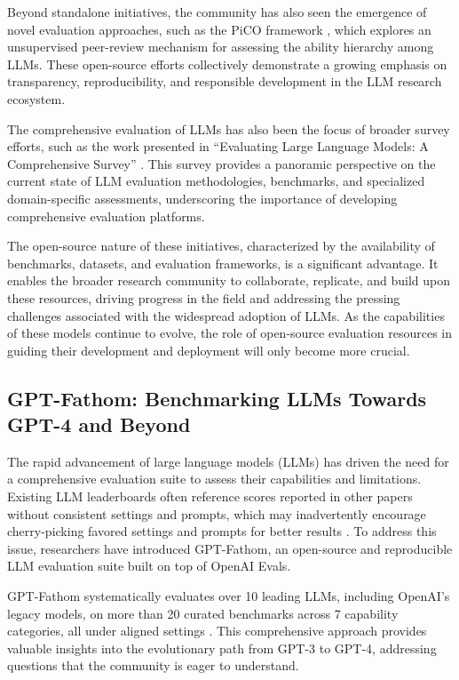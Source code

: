 \documentclass[11pt]{article}
\begin{document}
Beyond standalone initiatives, the community has also seen the emergence of novel evaluation approaches, such as the PiCO framework \cite{ref84}, which explores an unsupervised peer-review mechanism for assessing the ability hierarchy among LLMs. These open-source efforts collectively demonstrate a growing emphasis on transparency, reproducibility, and responsible development in the LLM research ecosystem.

The comprehensive evaluation of LLMs has also been the focus of broader survey efforts, such as the work presented in ``Evaluating Large Language Models: A Comprehensive Survey'' \cite{ref11}. This survey provides a panoramic perspective on the current state of LLM evaluation methodologies, benchmarks, and specialized domain-specific assessments, underscoring the importance of developing comprehensive evaluation platforms.

The open-source nature of these initiatives, characterized by the availability of benchmarks, datasets, and evaluation frameworks, is a significant advantage. It enables the broader research community to collaborate, replicate, and build upon these resources, driving progress in the field and addressing the pressing challenges associated with the widespread adoption of LLMs. As the capabilities of these models continue to evolve, the role of open-source evaluation resources in guiding their development and deployment will only become more crucial.

\subsection{GPT-Fathom: Benchmarking LLMs Towards GPT-4 and Beyond}

The rapid advancement of large language models (LLMs) has driven the need for a comprehensive evaluation suite to assess their capabilities and limitations. Existing LLM leaderboards often reference scores reported in other papers without consistent settings and prompts, which may inadvertently encourage cherry-picking favored settings and prompts for better results \cite{ref83}. To address this issue, researchers have introduced GPT-Fathom, an open-source and reproducible LLM evaluation suite built on top of OpenAI Evals.

GPT-Fathom systematically evaluates over 10 leading LLMs, including OpenAI's legacy models, on more than 20 curated benchmarks across 7 capability categories, all under aligned settings \cite{ref83}. This comprehensive approach provides valuable insights into the evolutionary path from GPT-3 to GPT-4, addressing questions that the community is eager to understand.
\end{document}
